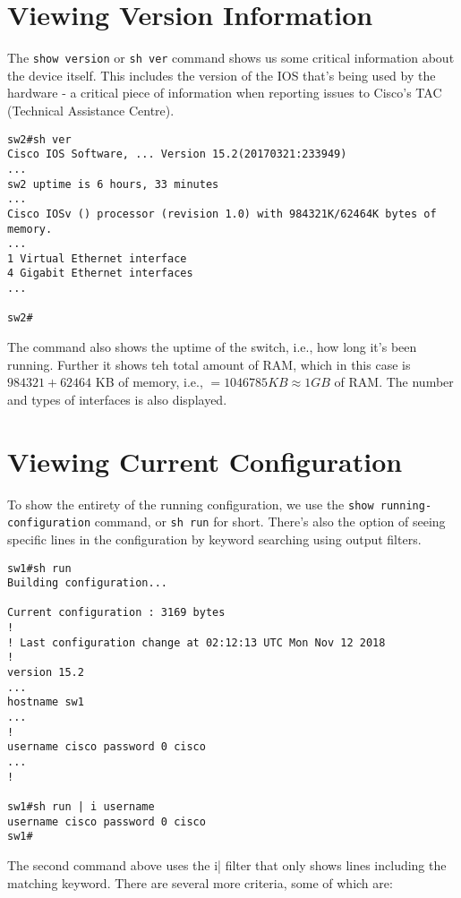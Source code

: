 \section{Viewing Version Information}
The \verb|show version| or \verb|sh ver| command shows us some critical information about the device itself. This includes the version of the IOS that's being used by the hardware - a critical piece of information when reporting issues to Cisco's TAC (Technical Assistance Centre). 

\vspace{-15pt}
\begin{verbatim}
sw2#sh ver
Cisco IOS Software, ... Version 15.2(20170321:233949)
...
sw2 uptime is 6 hours, 33 minutes
...
Cisco IOSv () processor (revision 1.0) with 984321K/62464K bytes of memory.
...
1 Virtual Ethernet interface
4 Gigabit Ethernet interfaces
...

sw2#
\end{verbatim}
\vspace{-10pt}

\noindent
The command also shows the uptime of the switch, i.e., how long it's been running. Further it shows teh total amount of RAM, which in this case is $984321 + 62464$ KB of memory, i.e., $=1046785 KB \approx 1GB$ of RAM. The number and types of interfaces is also displayed. 

\section{Viewing Current Configuration}
To show the entirety of the running configuration, we use the \verb|show running-configuration| command, or \verb|sh run| for short. There's also the option of seeing specific lines in the configuration by keyword searching using output filters. 

\vspace{-15pt}
\begin{verbatim}
sw1#sh run
Building configuration...

Current configuration : 3169 bytes
!
! Last configuration change at 02:12:13 UTC Mon Nov 12 2018
!
version 15.2
...
hostname sw1
...
!
username cisco password 0 cisco
...
!

sw1#sh run | i username
username cisco password 0 cisco
sw1#
\end{verbatim}
\vspace{-10pt}

\noindent
The second command above uses the \verb|| i| filter that only shows lines including the matching keyword. There are several more criteria, some of which are: 


